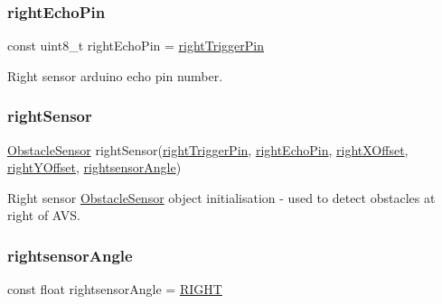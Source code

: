 \mbox{\label{bot_main_8ino_a513a215c9894c01e37f389b072c5cec4}} 
\subsubsection{\texorpdfstring{right\+Echo\+Pin}{rightEchoPin}}
{\footnotesize\ttfamily const uint8\+\_\+t right\+Echo\+Pin = \mbox{\hyperlink{bot_main_8ino_a906054d9d48970211789ac841d331898}{right\+Trigger\+Pin}}}



Right sensor arduino echo pin number. 

\mbox{\label{bot_main_8ino_a4b08258caa24173f4153413d596aea69}} 
\subsubsection{\texorpdfstring{right\+Sensor}{rightSensor}}
{\footnotesize\ttfamily \mbox{\hyperlink{class_obstacle_sensor}{Obstacle\+Sensor}} right\+Sensor(\mbox{\hyperlink{bot_main_8ino_a906054d9d48970211789ac841d331898}{right\+Trigger\+Pin}}, \mbox{\hyperlink{bot_main_8ino_a513a215c9894c01e37f389b072c5cec4}{right\+Echo\+Pin}}, \mbox{\hyperlink{bot_main_8ino_ac932cddb5bc68094c96d0034c92faef9}{right\+X\+Offset}}, \mbox{\hyperlink{bot_main_8ino_a07903b96b48e8e456debd9cc43c7af05}{right\+Y\+Offset}}, \mbox{\hyperlink{bot_main_8ino_a83724535498f068d5b44150a2bc4fcf8}{rightsensor\+Angle}})}



Right sensor \mbox{\hyperlink{class_obstacle_sensor}{Obstacle\+Sensor}} object initialisation -\/ used to detect obstacles at right of A\+VS. 

\mbox{\label{bot_main_8ino_a83724535498f068d5b44150a2bc4fcf8}} 
\subsubsection{\texorpdfstring{rightsensor\+Angle}{rightsensorAngle}}
{\footnotesize\ttfamily const float rightsensor\+Angle = \mbox{\hyperlink{bot_main_8ino_a80fb826a684cf3f0d306b22aa100ddac}{R\+I\+G\+HT}}}



